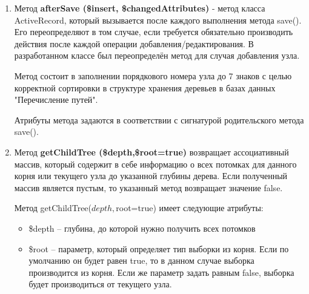 \documentclass[a4paper,14pt]{extreport}
\theoremstyle{definition}
\begin{document}
\begin{enumerate}
\item Метод \textbf{afterSave (\$insert, \$changedAttributes)} - метод класса ActiveRecord, который вызывается после каждого выполнения метода save(). Его переопределяют в том случае, если требуется обязательно производить действия после каждой операции добавления/редактирования. В разработанном классе был переопределён метод для случая добавления узла.

Метод состоит в заполнении порядкового номера узла до 7 знаков с целью корректной сортировки в структуре хранения деревьев в базах данных "Перечисление путей".

Атрибуты метода задаются в соответствии с сигнатурой родительского метода save().

\item Метод \textbf{getChildTree (\$depth,\$root=true)} возвращает ассоциативный массив, который содержит в себе информацию о всех потомках для данного корня или текущего узла до указанной глубины дерева. Если полученный массив является пустым, то указанный метод возвращает значение false.

Метод getChildTree($depth,$root=true) имеет следующие атрибуты:
\begin{itemize}
\item \$depth – глубина, до которой нужно получить всех потомков
\item \$root – параметр, который определяет тип выборки из корня. Если по умолчанию он будет равен true, то в данном случае выборка производится из корня. Если же параметр задать равным false, выборка будет производиться от текущего узла.
\end{itemize}


\end{enumerate}
\end{document}
